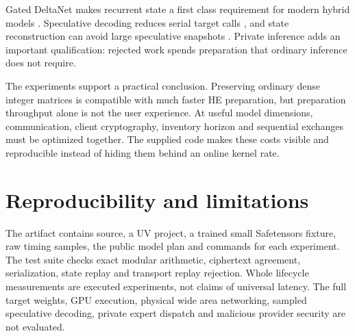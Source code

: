 \documentclass[10pt,twocolumn]{article}
\begin{document}
Gated DeltaNet makes recurrent state a first class requirement for modern hybrid
models \cite{gateddelta}. Speculative decoding reduces serial target calls
\cite{speculative}, and state reconstruction can avoid large speculative
snapshots \cite{treewy}. Private inference adds an important qualification:
rejected work spends preparation that ordinary inference does not require.

The experiments support a practical conclusion. Preserving ordinary dense
integer matrices is compatible with much faster HE preparation, but preparation
throughput alone is not the user experience. At useful model dimensions,
communication, client cryptography, inventory horizon and sequential exchanges
must be optimized together. The supplied code makes these costs visible and
reproducible instead of hiding them behind an online kernel rate.

\section*{Reproducibility and limitations}
The artifact contains source, a UV project, a trained small Safetensors fixture,
raw timing samples, the public model plan and commands for each experiment.
The test suite checks exact modular arithmetic, ciphertext agreement, serialization,
state replay and transport replay rejection. Whole lifecycle measurements are
executed experiments, not claims of universal latency. The full target weights,
GPU execution, physical wide area networking, sampled speculative decoding,
private expert dispatch and malicious provider security are not evaluated.
\end{document}
